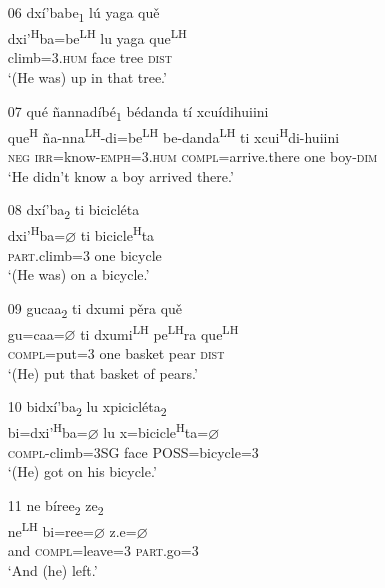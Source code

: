 \begin{itemize}
\item[06]
\glll dx\'{i}'babe\textsubscript{1} l\'{u} yaga qu\v{e} \\
dxi'\textsuperscript{H}ba=be\textsuperscript{LH}  lu yaga que\textsuperscript{LH} \\
climb=\textsc{3.hum} face tree \textsc{dist} \\
\glt `(He was) up in that tree.'


\item[07]
\glll qu\'{e} \~{n}annad\'{i}b\'{e}\textsubscript{1} b\'{e}danda t\'{i} xcu\'{i}dihuiini \\
que\textsuperscript{H} \~{n}a-nna\textsuperscript{LH}-di=be\textsuperscript{LH}  be-danda\textsuperscript{LH} ti xcui\textsuperscript{H}di-huiini \\
\textsc{neg} \textsc{irr}=know-\textsc{emph}=\textsc{3.hum} \textsc{compl}=arrive.there one boy-\textsc{dim} \\
\glt `He didn't know a boy arrived there.'
 

\item[08]
\glll dx\'{i}'ba\textsubscript{2} ti bicicl\'{e}ta  \\
dxi'\textsuperscript{H}ba={$\varnothing$} ti bicicle\textsuperscript{H}ta  \\
\textsc{part}.climb=\textsc{3} one bicycle  \\
\glt `(He was) on a bicycle.'


\item[09]
\glll gucaa\textsubscript{2} ti dxumi p\v{e}ra qu\v{e} \\
gu=caa={$\varnothing$} ti dxumi\textsuperscript{LH} pe\textsuperscript{LH}ra que\textsuperscript{LH} \\
\textsc{compl}=put=\textsc{3} one basket pear \textsc{dist} \\
\glt `(He) put that basket of pears.'


\item[10]
\glll bidx\'{i}'ba\textsubscript{2} lu xpicicl\'{e}ta\textsubscript{2} \\
bi=dxi'\textsuperscript{H}ba={$\varnothing$} lu x=bicicle\textsuperscript{H}ta={$\varnothing$}  \\
\textsc{compl}-climb=3SG face POSS=bicycle=\textsc{3} \\
\glt `(He) got on his bicycle.'

 
 \item[11]
\glll ne b\'{i}ree\textsubscript{2} ze\textsubscript{2} \\
ne\textsuperscript{LH} bi=ree={$\varnothing$} z.e={$\varnothing$} \\
and \textsc{compl}=leave=\textsc{3} \textsc{part}.go=\textsc{3} \\
\glt `And (he) left.'



\end{itemize}

